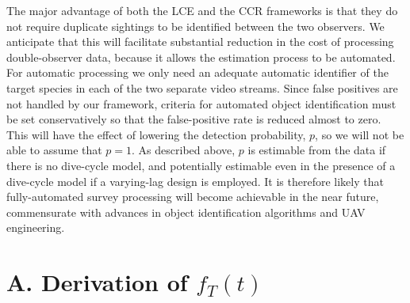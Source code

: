 \documentclass[useAMS, usenatbib, referee]{biom}\usepackage[]{graphicx}\usepackage[]{color}
\begin{document}

The major advantage of both the LCE and the CCR frameworks is that they do not require duplicate sightings to be identified between the two observers. We anticipate that this will facilitate substantial reduction in the cost of processing double-observer data, because it allows the estimation process to be automated. For automatic processing we only need an adequate automatic identifier of the target species in each of the two separate video streams. Since false positives are not handled by our framework, criteria for automated object identification must be set conservatively so that the false-positive rate is reduced almost to zero. This will have the effect of lowering the detection probability, $p$, so we will not be able to assume that $p=1$. As described above, $p$ is estimable from the data if there is no dive-cycle model, and potentially estimable even in the presence of a dive-cycle model if a varying-lag design is employed. It is therefore likely that fully-automated survey processing will become achievable in the near future, commensurate with advances in object identification algorithms and UAV engineering.





\appendix

\section{A. Derivation of $f_{T}(t)$}
\label{appx:firstpassage}
\end{document}
